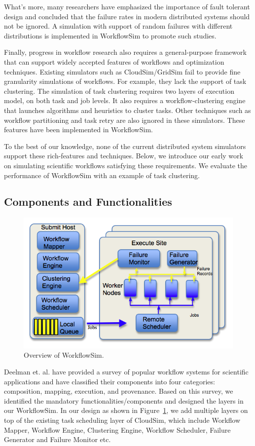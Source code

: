What’s more, many researchers \cite{Zhang2004, Tang1990, Schroeder2006, Sahoo2004, Oppenheimer2002, McConnel1979} have emphasized the importance of fault tolerant design and concluded that the failure rates in modern distributed systems should not be ignored. A simulation with support of random failures with different distributions is implemented in WorkflowSim to promote such studies. 

Finally, progress in workflow research also requires a general-purpose framework that can support widely accepted features of workflows and optimization techniques. Existing simulators such as CloudSim/GridSim \cite{Calheiros2011} fail to provide fine granularity simulations of workflows. For example, they lack the support of task clustering. The simulation of task clustering requires two layers of execution model, on both task and job levels. It also requires a workflow-clustering engine that launches algorithms and heuristics to cluster tasks. Other techniques such as workflow partitioning and task retry are also ignored in these simulators. These features have been implemented in WorkflowSim. 

To the best of our knowledge, none of the current distributed system simulators support these rich-features and techniques. Below, we introduce our early work on simulating scientific workflows satisfying these requirements. We evaluate the performance of WorkflowSim with an example of task clustering. 

\subsection{Components and Functionalities}

\begin{figure}[!htb]
	\centering
	\includegraphics[width=0.6\linewidth]{figures/workflowsim/wfs_overview.png}
	\caption{Overview of WorkflowSim.}
	\label{fig:model_wfs}
\end{figure}

Deelman et. al. \cite{Deelman2009} have provided a survey of popular workflow systems for scientific applications and have classified their components into four categories: composition, mapping, execution, and provenance. Based on this survey, we identified the mandatory functionalities/components and designed the layers in our WorkflowSim. In our design as shown in Figure~\ref{fig:model_wfs}, we add multiple layers on top of the existing task scheduling layer of CloudSim, which include Workflow Mapper, Workflow Engine, Clustering Engine, Workflow Scheduler, Failure Generator and Failure Monitor etc. 

